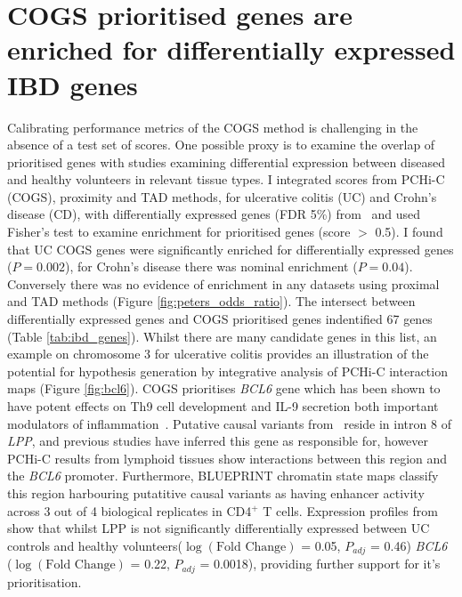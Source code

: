 \documentclass[a4paper,11pt]{report}
\begin{document}
\section{COGS prioritised genes are enriched for differentially expressed IBD genes} 
Calibrating performance metrics of the COGS method is challenging in the absence of a test set of scores. One possible proxy is to examine the overlap of prioritised genes with studies examining differential expression between diseased and healthy volunteers in relevant tissue types. I integrated scores from PCHi-C (COGS), proximity and TAD methods, for ulcerative colitis (UC) and Crohn's disease (CD), with differentially expressed genes (FDR 5\%) from~\citet{PetersLyonsLeeEtAl2016} and used Fisher's test to examine enrichment for prioritised genes (score $>$ 0.5). I found that UC COGS genes were significantly enriched for differentially expressed genes ($P = 0.002$), for Crohn's disease there was nominal enrichment ($P = 0.04$). Conversely there was no evidence of enrichment in any datasets using proximal and TAD methods (Figure \ref{fig:peters_odds_ratio}). The intersect between differentially expressed genes and COGS prioritised genes indentified 67 genes (Table \ref{tab:ibd_genes}). Whilst there are many candidate genes in this list, an example on chromosome 3 for ulcerative colitis provides an illustration of the potential for hypothesis generation by integrative analysis of PCHi-C interaction maps (Figure \ref{fig:bcl6}). COGS prioritises \textit{BCL6} gene which has been shown to have potent effects on Th9 cell development and IL-9 secretion both important modulators of inflammation~\citep{BassilOrentOlahEtAl2014}. Putative causal variants from~\citet{Anderson2011-ch} reside in intron 8 of \textit{LPP}, and previous studies have inferred this gene as responsible for, however PCHi-C results from lymphoid tissues show interactions between this region and the \textit{BCL6} promoter. Furthermore, BLUEPRINT chromatin state maps classify this region harbouring putatitive causal variants as having enhancer activity across 3 out of 4 biological replicates in CD4$^+$ T cells. Expression profiles from~\citet{PetersLyonsLeeEtAl2016} show that whilst LPP is not significantly differentially expressed between UC controls and healthy volunteers($\log(\text{Fold Change})$ = 0.05, $P_{adj}$ =  0.46) \textit{BCL6} ($\log(\text{Fold Change})$ = 0.22, $P_{adj}$ =  0.0018), providing further support for it's prioritisation.
\end{document}

